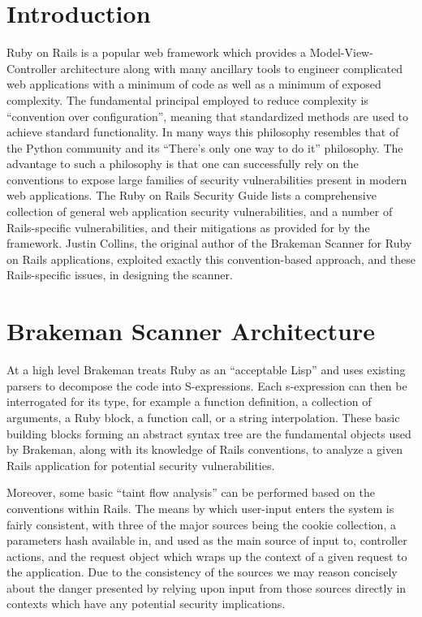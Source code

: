 \documentclass[conference]{IEEEtran}
\begin{document}
\section{Introduction}

Ruby on Rails is a popular web framework which provides a Model-View-Controller
architecture along with many ancillary tools to engineer complicated web
applications with a minimum of code as well as a minimum of exposed complexity.
The fundamental principal employed to reduce complexity is ``convention over
configuration'', meaning that standardized methods are used to achieve standard
functionality.  In many ways this philosophy resembles that of the Python
community and its ``There's only one way to do it'' philosophy.  The
advantage to such a philosophy is that one can successfully rely on the
conventions to expose large families of security vulnerabilities present in
modern web applications.  The Ruby on Rails Security Guide\cite{rails_security}
lists a comprehensive collection of general web application security
vulnerabilities, and a number of Rails-specific vulnerabilities, and their
mitigations as provided for by the framework.  Justin Collins, the original
author of the Brakeman Scanner for Ruby on Rails applications, exploited exactly
this convention-based approach, and these Rails-specific issues, in designing
the scanner.

\section{Brakeman Scanner Architecture}

At a high level Brakeman treats Ruby as an ``acceptable Lisp'' and uses
existing parsers to decompose the code into S-expressions\cite{sexp_for_rubyists}.  Each
s-expression can then be interrogated for its type, for example a function definition, a
collection of arguments, a Ruby block, a function call, or a string interpolation.  These
basic building blocks forming an abstract syntax tree are the fundamental objects used by
Brakeman, along with its knowledge of Rails conventions, to analyze a given Rails
application for potential security vulnerabilities.

Moreover, some basic ``taint flow analysis'' can be performed based on the conventions
within Rails.  The means by which user-input enters the system is fairly consistent, with
three of the major sources being the cookie collection, a parameters hash available in,
and used as the main source of input to, controller actions, and the request object which
wraps up the context of a given request to the application.  Due to the consistency of the
sources we may reason concisely about the danger presented by relying upon input from
those sources directly in contexts which have any potential security implications.
\end{document}
